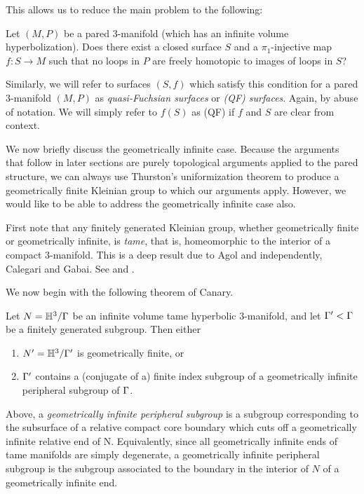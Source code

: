 This allows us to reduce the main problem to the following:

\begin{prob}

Let $(M,P)$ be a pared $3$-manifold (which has an infinite volume
hyperbolization).  Does there exist a closed surface $S$ and
a $\pi_1$-injective map $f \colon S \to M$ such that no loops in $P$ are freely
homotopic to images of loops in $S$?

\end{prob}

Similarly, we will refer to surfaces $(S,f)$ which satisfy this condition for
a pared $3$-manifold $(M,P)$ as \emph{quasi-Fuchsian surfaces} or \emph{(QF)
surfaces}.  Again, by abuse of notation. We will simply refer to $f(S)$ as (QF)
if $f$ and $S$ are clear from context.

We now briefly discuss the geometrically infinite case. Because the arguments
that follow in later sections are purely topological arguments applied to the
pared structure, we can always use Thurston's uniformization theorem to produce
a geometrically finite Kleinian group to which our arguments apply. However, we
would like to be able to address the geometrically infinite case also.

First note that any finitely generated Kleinian group, whether geometrically
finite or geometrically infinite, is \emph{tame}, that is, homeomorphic to the
interior of a compact $3$-manifold. This is a deep result due to Agol and
independently, Calegari and Gabai. See \cite{Agoltameness} and
\cite{CalegariGabai}.

We now begin with the following theorem of Canary.

\begin{thm}

Let $N = \mathbb{H}^3/\Gamma$ be an infinite volume tame hyperbolic $3$-manifold, and let
$\Gamma' < \Gamma$ be a finitely generated subgroup. Then either

\begin{enumerate}

\item $N' = \mathbb{H}^3 / \Gamma'$ is geometrically finite, or

\item $\Gamma'$ contains a (conjugate of a) finite index subgroup of
a geometrically infinite peripheral subgroup of $\Gamma$.

\end{enumerate}

Above, a \emph{geometrically infinite peripheral subgroup} is a subgroup
corresponding to the subsurface of a relative compact core boundary which cuts
off a geometrically infinite relative end of N. Equivalently, since all
geometrically infinite ends of tame manifolds are simply degenerate,
a geometrically infinite peripheral subgroup is the subgroup associated to the
boundary in the interior of $N$ of a geometrically infinite end.

\end{thm}

